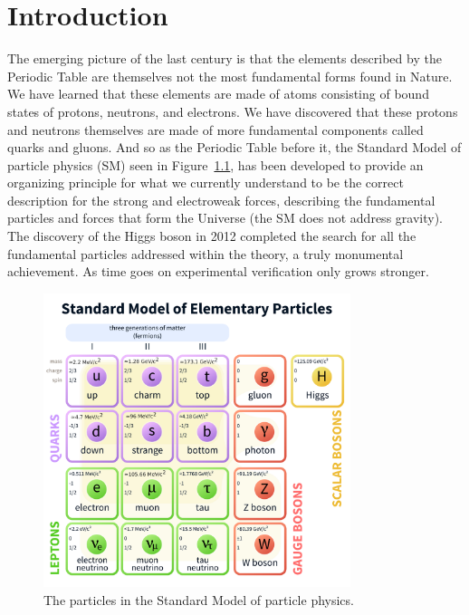 \chapter{Introduction}

The emerging picture of the last century is that the elements described by the Periodic Table are themselves not the most fundamental forms found in Nature. We have learned that these elements are made of atoms consisting of bound states of protons, neutrons, and electrons. We have discovered that these protons and neutrons themselves are made of more fundamental components called quarks and gluons. And so as the Periodic Table before it, the Standard Model of particle physics (SM) seen in Figure~\ref{fig:sm}, has been developed to provide an organizing principle for what we currently understand to be the correct description for the strong and electroweak forces, describing the fundamental particles and forces that form the Universe (the SM does not address gravity). The discovery of the Higgs boson in 2012 \cite{higgsdisc} completed the search for all the fundamental particles addressed within the theory, a truly monumental achievement. As time goes on experimental verification only grows stronger.

\begin{figure}
\centering
\includegraphics[width=0.8\textwidth]{figs/StandardModelofElementaryParticles.pdf}
\caption[The particles in the Standard Model of particle physics.]{The particles in the Standard Model of particle physics. \cite{wiki:xxx}}
\label{fig:sm}
\end{figure}

